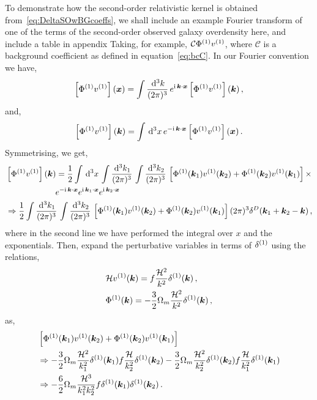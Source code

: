 To demonstrate how the second-order relativistic kernel is obtained from~\eqref{eq:DeltaSOwBGcoeffs}, we shall include an example Fourier transform of one of the terms of the second-order observed galaxy overdensity here, and include a table in appendix 
Taking, for example, $\mathcal{C} \Phi^{(1)} v^{(1)}$, where $\mathcal{C}$ is a background coefficient as defined in equation~\eqref{eq:bcC}. In our Fourier convention we have, 
\begin{equation}
	\left[ \Phi^{(1)} v^{(1)} \right](\bm {x}) = \int \frac{\,\mathrm{d}^3 k}{(2\pi)^3}\, e^{\mathrm{i\,} \bm {k}\cdot\bm {x}} \left[ \Phi^{(1)} v^{(1)} \right] (\bm {k})\,,
\end{equation}
and, 
\begin{equation}
	\left[ \Phi^{(1)} v^{(1)} \right](\bm {k}) = \int \,\mathrm{d}^3 x\, e^{- \mathrm{i\,} \bm {k}\cdot\bm {x}} \left[ \Phi^{(1)} v^{(1)} \right](\bm {x})\,.
\end{equation}
Symmetrising, we get, 
\begin{align}
	&\left[ \Phi^{(1)} v^{(1)} \right](\bm {k}) = \frac{1}{2} \int \,\mathrm{d}^3 x\, \int \frac{\,\mathrm{d}^3 k_1}{(2 \pi)^3}\, \int \frac{\,\mathrm{d}^3 k_2}{(2\pi)^3}\, \left[ \Phi^{(1)}(\bm {k}_1) v^{(1)}(\bm {k}_2) + \Phi^{(1)}(\bm {k}_2) v^{(1)}(\bm {k}_1) \right] \times \nonumber \\
	& \qquad\qquad\qquad e^{-\mathrm{i\,} \bm {k}\cdot\bm {x}} e^{\mathrm{i\,} \bm {k}_1\cdot\bm {x}} e^{\mathrm{i\,} \bm {k}_2\cdot\bm {x}} \\
	&\Rightarrow \frac{1}{2} \int\frac{\,\mathrm{d}^3 k_1}{(2\pi)^3}\,\int \frac{\,\mathrm{d}^3 k_2}{(2\pi)^3}\, \left[ \Phi^{(1)}(\bm {k}_1) v^{(1)}(\bm {k}_2) + \Phi^{(1)}(\bm {k}_2) v^{(1)}(\bm {k}_1)\right] (2\pi)^3 \delta^D(\bm {k}_1+\bm {k}_2-\bm {k})\,,
\end{align}
where in the second line we have performed the integral over $x$ and the exponentials. Then, expand the perturbative variables in terms of $\delta^{(1)}$ using the relations,
\begin{align}
	&\mathcal{H} v^{(1)}(\bm {k}) = f \frac{\mathcal{H}^2}{k^2} \delta^{(1)}(\bm {k})\,,\\
	&\Phi^{(1)}(\bm {k}) = - \frac{3}{2} \Omega_m \frac{\mathcal{H}^2}{k^2} \delta^{(1)}(\bm {k})\,,
\end{align}
as, 
\begin{align}
	&\left[ \Phi^{(1)}(\bm {k}_1) v^{(1)}(\bm {k}_2) + \Phi^{(1)}(\bm {k}_2) v^{(1)}(\bm {k}_1) \right]\\
	&\Rightarrow - \frac{3}{2} \Omega_m \frac{\mathcal{H}^2}{k_1^2} \delta^{(1)}(\bm {k}_1) f \frac{\mathcal{H}}{k_2^2} \delta^{(1)}(\bm {k}_2) - \frac{3}{2} \Omega_m \frac{\mathcal{H}^2}{k_2^2} \delta^{(1)}(\bm {k}_2) f \frac{\mathcal{H}}{k_1^2} \delta^{(1)}(\bm {k}_1)\\
	&\Rightarrow - \frac{6}{2} \Omega_m \frac{\mathcal{H}^3}{k_1^2 k_2^2} f \delta^{(1)}(\bm {k}_1) \delta^{(1)}(\bm {k}_2)\,.
\end{align}
